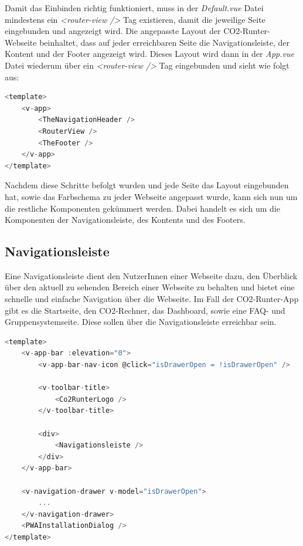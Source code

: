 Damit das Einbinden richtig funktioniert, muss in der \textit{Default.vue} Datei mindestens ein \textit{<router-view />} Tag existieren, damit die jeweilige Seite eingebunden und angezeigt wird. Die angepasste Layout der CO2-Runter-Webseite beinhaltet, dass auf jeder erreichbaren Seite die Navigationsleiste, der Kontent und der Footer angezeigt wird. Dieses Layout wird dann in der \textit{App.vue} Datei wiederum über ein \textit{<router-view />} Tag eingebunden und sieht wie folgt aus:

\begin{lstlisting}[language={JavaScript}, caption={Layout Definition}]
<template>
    <v-app>
        <TheNavigationHeader />
        <RouterView />
        <TheFooter />
    </v-app>
</template>
\end{lstlisting}

Nachdem diese Schritte befolgt wurden und jede Seite das Layout eingebunden hat, sowie das Farbschema zu jeder Webseite angepasst wurde, kann sich nun um die restliche Komponenten gekümmert werden. Dabei handelt es sich um die Komponenten der Navigationsleiste, des Kontents und des Footers.

\subsection{Navigationsleiste}

Eine Navigationsleiste dient den NutzerInnen einer Webseite dazu, den Überblick über den aktuell zu sehenden Bereich einer Webseite zu behalten und bietet eine schnelle und einfache Navigation über die Webseite. Im Fall der CO2-Runter-App gibt es die Startseite, den CO2-Rechner, das Dashboard, sowie eine FAQ- und Gruppensystemseite. Diese sollen über die Navigationsleiste erreichbar sein.

\begin{lstlisting}[language={JavaScript}, caption={Navigationsleiste für Web als auch Mobile}]
<template>
    <v-app-bar :elevation="0">
        <v-app-bar-nav-icon @click="isDrawerOpen = !isDrawerOpen" />

        <v-toolbar-title>
            <Co2RunterLogo />
        </v-toolbar-title>

        <div>
            <Navigationsleiste />
        </div>
    </v-app-bar>

    <v-navigation-drawer v-model="isDrawerOpen">
        ...
    </v-navigation-drawer>
    <PWAInstallationDialog />
</template>
\end{lstlisting}

